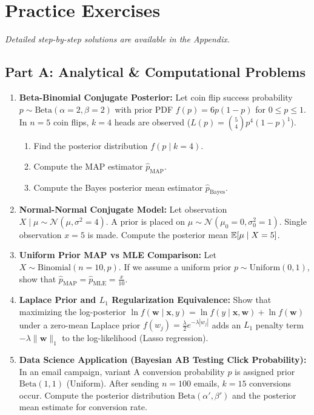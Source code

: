 \newpage
\section{Practice Exercises}
\textit{Detailed step-by-step solutions are available in the Appendix.}

\subsection*{Part A: Analytical \& Computational Problems}

\begin{enumerate}
\item \textbf{Beta-Binomial Conjugate Posterior:} Let coin flip success probability $p \sim \text{Beta}(\alpha = 2, \beta = 2)$ with prior PDF $f(p) = 6p(1-p)$ for $0 \le p \le 1$. In $n = 5$ coin flips, $k = 4$ heads are observed ($L(p) = \binom{5}{4} p^4 (1-p)^1$).
    \begin{enumerate}
        \item Find the posterior distribution $f(p \mid k = 4)$.
        \item Compute the MAP estimator $\hat{p}_{\text{MAP}}$.
        \item Compute the Bayes posterior mean estimator $\hat{p}_{\text{Bayes}}$.
    \end{enumerate}

\item \textbf{Normal-Normal Conjugate Model:} Let observation $X \mid \mu \sim \mathcal{N}(\mu, \sigma^2 = 4)$. A prior is placed on $\mu \sim \mathcal{N}(\mu_0 = 0, \sigma_0^2 = 1)$. Single observation $x = 5$ is made. Compute the posterior mean $\mathbb{E}[\mu \mid X = 5]$.

\item \textbf{Uniform Prior MAP vs MLE Comparison:} Let $X \sim \text{Binomial}(n = 10, p)$. If we assume a uniform prior $p \sim \text{Uniform}(0, 1)$, show that $\hat{p}_{\text{MAP}} = \hat{p}_{\text{MLE}} = \frac{x}{10}$.

\item \textbf{Laplace Prior and $L_1$ Regularization Equivalence:} Show that maximizing the log-posterior $\ln f(\mathbf{w} \mid \mathbf{x}, y) = \ln f(y \mid \mathbf{x}, \mathbf{w}) + \ln f(\mathbf{w})$ under a zero-mean Laplace prior $f(w_j) = \frac{\lambda}{2} e^{-\lambda |w_j|}$ adds an $L_1$ penalty term $-\lambda \|\mathbf{w}\|_1$ to the log-likelihood (Lasso regression).

\item \textbf{Data Science Application (Bayesian AB Testing Click Probability):} In an email campaign, variant A conversion probability $p$ is assigned prior $\text{Beta}(1, 1)$ (Uniform). After sending $n = 100$ emails, $k = 15$ conversions occur. Compute the posterior distribution $\text{Beta}(\alpha', \beta')$ and the posterior mean estimate for conversion rate.
\end{enumerate}

